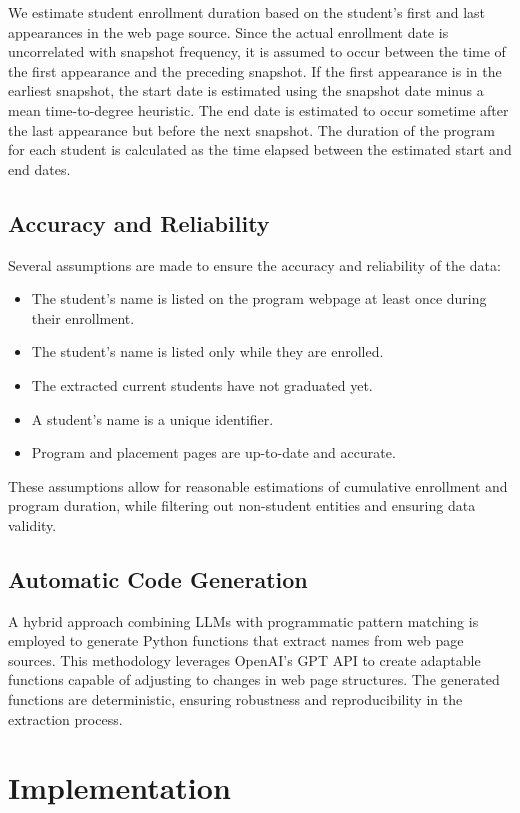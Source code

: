 \documentclass[11pt]{article}
\begin{document}
We estimate student enrollment duration based on the student's first and last appearances in the web page source.
Since the actual enrollment date is uncorrelated with snapshot frequency, it is assumed to occur between the time of the first appearance and the preceding snapshot. If the first appearance is in the earliest snapshot, the start date is estimated using the snapshot date minus a mean time-to-degree heuristic. The end date is estimated to occur sometime after the last appearance but before the next snapshot. The duration of the program for each student is calculated as the time elapsed between the estimated start and end dates.

\subsection{Accuracy and Reliability}

Several assumptions are made to ensure the accuracy and reliability of the data:
\begin{itemize}
    \item The student's name is listed on the program webpage at least once during their enrollment.
    \item The student's name is listed only while they are enrolled.
    \item The extracted current students have not graduated yet.
    \item A student's name is a unique identifier.
    \item Program and placement pages are up-to-date and accurate.
\end{itemize}

These assumptions allow for reasonable estimations of cumulative enrollment and program duration, while filtering out non-student entities and ensuring data validity.

\subsection{Automatic Code Generation}

A hybrid approach combining LLMs with programmatic pattern matching is employed to generate Python functions that extract names from web page sources. This methodology leverages OpenAI's GPT API to create adaptable functions capable of adjusting to changes in web page structures. The generated functions are deterministic, ensuring robustness and reproducibility in the extraction process.

\section{Implementation}
\end{document}
